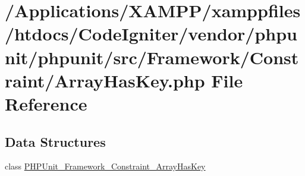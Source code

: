 \hypertarget{_array_has_key_8php}{}\section{/\+Applications/\+X\+A\+M\+P\+P/xamppfiles/htdocs/\+Code\+Igniter/vendor/phpunit/phpunit/src/\+Framework/\+Constraint/\+Array\+Has\+Key.php File Reference}
\label{_array_has_key_8php}
\subsection*{Data Structures}
\begin{DoxyCompactItemize}
\item 
class \mbox{\hyperlink{class_p_h_p_unit___framework___constraint___array_has_key}{P\+H\+P\+Unit\+\_\+\+Framework\+\_\+\+Constraint\+\_\+\+Array\+Has\+Key}}
\end{DoxyCompactItemize}
